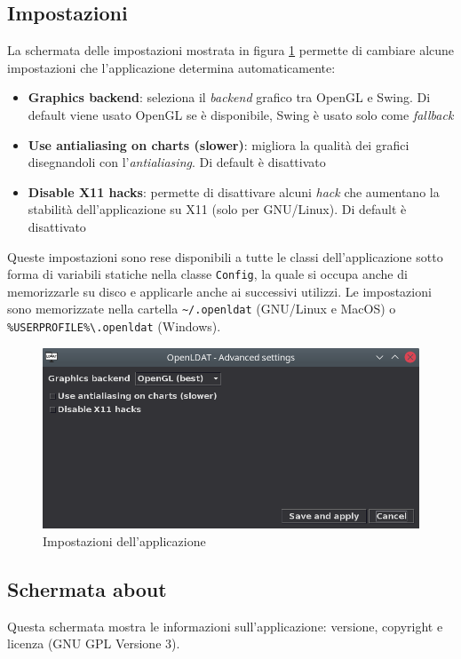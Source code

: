 \subsection{Impostazioni}
La schermata delle impostazioni mostrata in figura \ref{fig:gui_settings} permette di cambiare alcune impostazioni che l'applicazione determina automaticamente:\begin{itemize}
	\item \textbf{Graphics backend}: seleziona il \textit{backend} grafico tra OpenGL e Swing. Di default viene usato OpenGL se è disponibile, Swing è usato solo come \textit{fallback}
	\item \textbf{Use antialiasing on charts (slower)}: migliora la qualità dei grafici disegnandoli con l'\textit{antialiasing}. Di default è disattivato
	\item \textbf{Disable X11 hacks}: permette di disattivare alcuni \textit{hack} che aumentano la stabilità dell'applicazione su X11 (solo per GNU/Linux). Di default è disattivato
\end{itemize}

Queste impostazioni sono rese disponibili a tutte le classi dell'applicazione sotto forma di variabili statiche nella classe \texttt{Config}, la quale si occupa anche di memorizzarle su disco e applicarle anche ai successivi utilizzi. Le impostazioni sono memorizzate nella cartella \texttt{\textasciitilde/.openldat} (GNU/Linux e MacOS) o \texttt{\%USERPROFILE\%\textbackslash.openldat} (Windows).

\begin{figure}[H]
	\centering
	\includegraphics[width=.8\textwidth]{Applicazione_files/gui_settings.png}
	\caption{Impostazioni dell'applicazione}
	\label{fig:gui_settings}
\end{figure}

\subsection{Schermata about}
Questa schermata mostra le informazioni sull'applicazione: versione, copyright e licenza (GNU GPL Versione 3).

